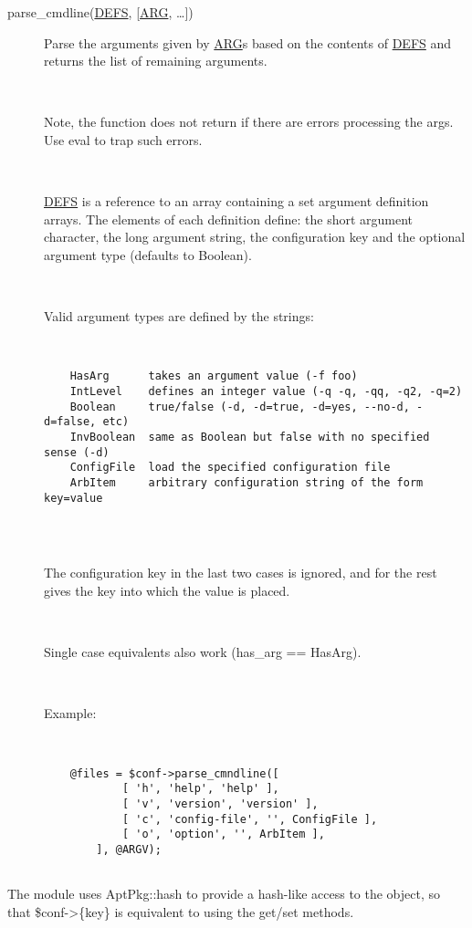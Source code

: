 \documentclass[]{article}
\renewcommand{\emph}[1]{\underline{#1}}
\begin{document}
\begin{description}
\item[parse\_cmdline(\emph{DEFS}, {[}\emph{ARG}, \ldots{}{]})]
Parse the arguments given by \emph{ARG}s based on the contents of
\emph{DEFS} and returns the list of remaining arguments.

~

Note, the function does not return if there are errors processing the
args. Use eval to trap such errors.

~

\emph{DEFS} is a reference to an array containing a set argument
definition arrays. The elements of each definition define: the short
argument character, the long argument string, the configuration key and
the optional argument type (defaults to Boolean).

~

Valid argument types are defined by the strings:

~

\begin{verbatim}
    HasArg      takes an argument value (-f foo)
    IntLevel    defines an integer value (-q -q, -qq, -q2, -q=2)
    Boolean     true/false (-d, -d=true, -d=yes, --no-d, -d=false, etc)
    InvBoolean  same as Boolean but false with no specified sense (-d)
    ConfigFile  load the specified configuration file
    ArbItem     arbitrary configuration string of the form key=value
    
\end{verbatim}

~

The configuration key in the last two cases is ignored, and for the rest
gives the key into which the value is placed.

~

Single case equivalents also work (has\_arg == HasArg).

~

Example:

~

\begin{verbatim}
    @files = $conf->parse_cmndline([
            [ 'h', 'help', 'help' ],
            [ 'v', 'version', 'version' ],
            [ 'c', 'config-file', '', ConfigFile ],
            [ 'o', 'option', '', ArbItem ],
        ], @ARGV);
    
\end{verbatim}
\end{description}

The module uses AptPkg::hash to provide a hash-like access to the
object, so that \$conf-\textgreater{}\{key\} is equivalent to using the
get/set methods.
\end{document}
